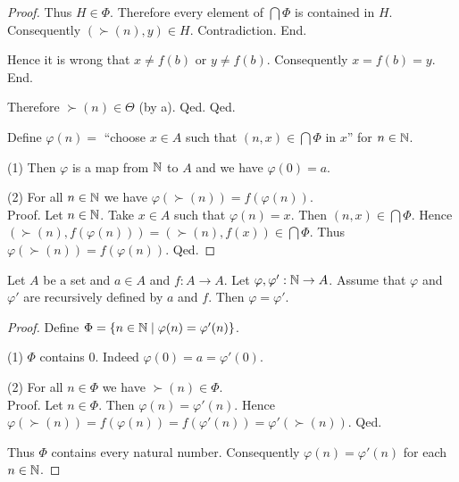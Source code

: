 \documentclass[10pt]{article}
\begin{document}
\begin{forthel}
\begin{proof}
              Thus $H \in \Phi$.
              Therefore every element of $\bigcap \Phi$ is contained in $H$.
              Consequently $(\succ(n),y) \in H$.
              Contradiction.
            End.

            Hence it is wrong that $x \neq f(b)$ or $y \neq f(b)$.
            Consequently $x = f(b) = y$.
          End.

          Therefore $\succ(n) \in \Theta$ (by a).
        Qed.
      Qed.

      Define $\varphi(n) =$ ``choose $x \in A$ such that $(n, x) \in
      \bigcap \Phi$ in $x$'' for $n \in \mathbb{N}$.

      (1) Then $\varphi$ is a map from $\mathbb{N}$ to $A$ and we have
      $\varphi(0) = a$.

      (2) For all $n \in \mathbb{N}$ we have $\varphi(\succ(n)) =
      f(\varphi(n))$. \\
      Proof.
        Let $n \in \mathbb{N}$.
        Take $x \in A$ such that $\varphi(n) = x$.
        Then $(n, x) \in \bigcap \Phi$.
        Hence $(\succ(n), f(\varphi(n))) = (\succ(n), f(x)) \in \bigcap \Phi$.
        Thus $\varphi(\succ(n)) = f(\varphi(n))$.
      Qed.
    \end{proof}
  \end{forthel}

  \begin{forthel}
    \begin{proposition}
      Let $A$ be a set and $a \in A$ and $f : A \to A$.
      Let $\varphi, \varphi' : \mathbb{N} \to A$.
      Assume that $\varphi$ and $\varphi'$ are recursively defined by $a$ and
      $f$.
      Then $\varphi = \varphi'$.
    \end{proposition}
    \begin{proof}
      Define $\Phi = \{ n \in \mathbb{N} \mid \varphi(n) = \varphi'(n) \}$.

      (1) $\Phi$ contains $0$.
      Indeed $\varphi(0) = a = \varphi'(0)$.

      (2) For all $n \in \Phi$ we have $\succ(n) \in \Phi$. \\
      Proof.
        Let $n \in \Phi$.
        Then $\varphi(n) = \varphi'(n)$.
        Hence $\varphi(\succ(n))
          = f(\varphi(n))
          = f(\varphi'(n))
          = \varphi'(\succ(n))$.
      Qed.

      Thus $\Phi$ contains every natural number.
      Consequently $\varphi(n) = \varphi'(n)$ for each $n \in \mathbb{N}$.
    \end{proof}
  \end{forthel}
\end{document}
